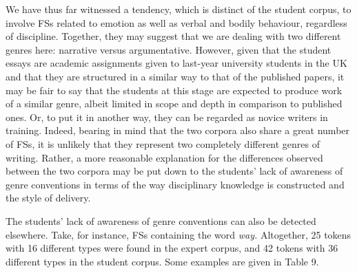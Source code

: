\begin{styleStandard}
We have thus far witnessed a tendency, which is distinct of the student corpus, to involve FSs related to emotion as well as verbal and bodily behaviour, regardless of discipline. Together, they may suggest that we are dealing with two different genres here: narrative versus argumentative. However, given that the student essays are academic assignments given to last-year university students in the UK and that they are structured in a similar way to that of the published papers, it may be fair to say that the students at this stage are expected to produce work of a similar genre, albeit limited in scope and depth in comparison to published ones. Or, to put it in another way, they can be regarded as novice writers in training. Indeed, bearing in mind that the two corpora also share a great number of FSs, it is unlikely that they represent two completely different genres of writing. Rather, a more reasonable explanation for the differences observed between the two corpora may be put down to the students’ lack of awareness of genre conventions in terms of the way disciplinary knowledge is constructed and the style of delivery.
\end{styleStandard}

\begin{styleStandard}
The students’ lack of awareness of genre conventions can also be detected elsewhere. Take, for instance, FSs containing the word \textit{way. }Altogether, 25 tokens with 16 different types were found in the expert corpus, and 42 tokens with 36 different types in the student corpus. Some examples are given in Table 9. 
\end{styleStandard}

